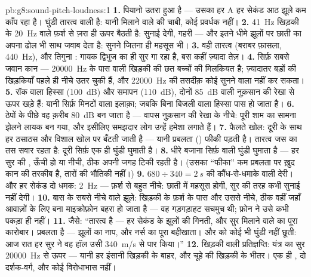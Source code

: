 \begin{solution}{pb:g8:sound-pitch-loudness:1}
\textbf{1.} पियानो उतरा हुआ है --- उसका हर A हर सेकंड आठ झूले कम
काँप रहा है। घुंडी तारत्व वाली है: यानी मिलाने वाले की चाबी, कोई
प्रवर्धक नहीं।
\textbf{2.} \qty{41}{Hz} खिड़की के \qty{20}{Hz} वाले फ़र्श से ज़रा ही
ऊपर बैठती है: सुनाई देगी, गहरी --- और इतने धीमे झूलों पर छाती का अपना
ढोल भी साथ जवाब देता है: सुनने जितना ही महसूस भी।
\textbf{3.} वही तारत्व (बराबर फ़ासला, \qty{440}{Hz}), और तिगुना :
गायक द्विभुज का ही सुर गा रहा है, बस कहीं ज़्यादा तेज़।
\textbf{4.} सिर्फ़ सबसे जवान कान --- \qty{20000}{Hz} के पास वाली
खिड़की की छत बच्चों की मिलकियत है; ज़्यादातर बड़ों की खिड़कियाँ पहले
ही नीचे उतर चुकी हैं, और \qty{22000}{Hz} की तसदीक़ कोई सुनने वाला नहीं
कर सकता।
\textbf{5.} रॉक वाला हिस्सा (\qty{100}{dB}) और समापन (\qty{110}{dB}),
दोनों \qty{85}{dB} वाली नुक़सान की रेखा से ऊपर खड़े हैं: यानी सिर्फ़
मिनटों वाला इलाक़ा; जबकि बिना बिजली वाला हिस्सा पास हो जाता है।
\textbf{6.} ठेपों के पीछे वह क़रीब \qty{80}{dB} बन जाता है ---
वापस नुक़सान की रेखा के नीचे: पूरी शाम का सामना झेलने लायक बन गया,
और इसीलिए समझदार लोग उन्हें हमेशा लगाते हैं।
\textbf{7.} फैलते खोल: दूरी के साथ हर ठसाठस और विशाल खोल पर बँटती जाती
है --- यानी प्रबलता () फीकी पड़ती है। तारत्व जस का तस सवार रहता
है: दूरी सिर्फ़ एक ही घुंडी घुमाती है।
\textbf{8.} धीरे बजाना सिर्फ़  वाली घुंडी घुमाता है --- हर सुर की
, ऊँची हो या नीची, ठीक अपनी जगह टिकी रहती है। (उसका ``फीका''
कम प्रबलता पर ख़ुद कान की तरकीब है, तारों की भौतिकी नहीं।)
\textbf{9.} $680 \div 340 = \qty{2}{s}$ की कौंध-से-धमाके वाली देरी।
और हर सेकंड दो धमक: \qty{2}{Hz} --- फ़र्श से बहुत नीचे: छाती में
महसूस होगी, सुर की तरह कभी सुनाई नहीं देगी।
\textbf{10.} बास के सबसे नीचे वाले झूले: खिड़की के फ़र्श के पास और
उससे नीचे, ठीक वहीं जहाँ आवाज़ों के लिए बना माइक्रोफ़ोन बहरा हो जाता
है --- वह गड़गड़ाहट सचमुच थी; फ़ोन ने उसे कभी पकड़ा ही नहीं।
\textbf{11.} जैसे: ``तारत्व  है --- हर सेकंड के झूलों की
गिनती, और सुर मिलाने वाले का पूरा कारोबार। प्रबलता  है ---
झूलों का नाप, और नर्स का पूरा बहीखाता। और  को कोई भी घुंडी नहीं
छूती: आज रात हर सुर ने वह हॉल उसी \qty{340}{m/s} से पार किया।''
\textbf{12.} खिड़की वाली प्रतिज्ञप्ति: यंत्र का सुर \qty{20000}{Hz}
से ऊपर --- यानी हर इंसानी खिड़की के बाहर, और चूहे की खिड़की के भीतर।
एक ही , दो दर्शक-वर्ग, और कोई विरोधाभास नहीं।
\end{solution}
